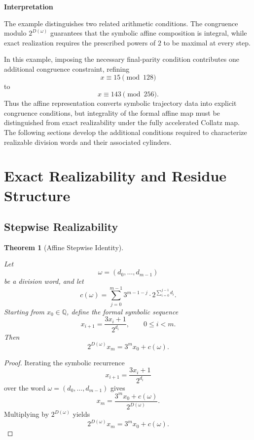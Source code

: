 \documentclass[12pt, oneside]{article}
\numberwithin{equation}{section}
\theoremstyle{definition}
\theoremstyle{plain}
\newtheorem{theorem}{Theorem}[section]
\theoremstyle{remark}
\begin{document}
\medskip

\noindent
\textbf{Interpretation}

The example distinguishes two related arithmetic conditions. The
congruence modulo \(2^{D(\omega)}\) guarantees that the symbolic affine
composition is integral, while exact realization requires the prescribed
powers of \(2\) to be maximal at every step.

In this example, imposing the necessary final-parity condition contributes
one additional congruence constraint, refining
\[
x\equiv15\pmod{128}
\]
to
\[
x\equiv143\pmod{256}.
\]
Thus the affine representation converts symbolic trajectory data into
explicit congruence conditions, but integrality of the formal affine map
must be distinguished from exact realizability under the fully accelerated
Collatz map. The following sections develop the additional conditions
required to characterize realizable division words and their associated
cylinders.


\section{Exact Realizability and Residue Structure}
\label{sec:exact-realizability-residue}

\subsection{Stepwise Realizability}

\begin{theorem}[Affine Stepwise Identity]
\label{thm:affine-stepwise-identity}

Let
\[
\omega=(d_0,\dots,d_{m-1})
\]
be a division word, and let
\[
c(\omega) = \sum_{j=0}^{m-1} 3^{m-1-j}\cdot 2^{\sum_{i=0}^{j-1}d_i}.
\]
Starting from \(x_0\in\mathbb Q\), define the formal symbolic sequence
\[
x_{i+1} = \frac{3x_i+1}{2^{d_i}},
\qquad
0\le i<m.
\]
Then
\[
2^{D(\omega)}x_m = 3^m x_0+c(\omega).
\]
\end{theorem}

\begin{proof}
Iterating the symbolic recurrence
\[
x_{i+1}=\frac{3x_i+1}{2^{d_i}}
\]
over the word \(\omega=(d_0,\dots,d_{m-1})\) gives
\[
x_m=\frac{3^m x_0+c(\omega)}{2^{D(\omega)}}.
\]
Multiplying by \(2^{D(\omega)}\) yields
\[
2^{D(\omega)}x_m=3^m x_0+c(\omega).
\]
\end{proof}
\end{document}
